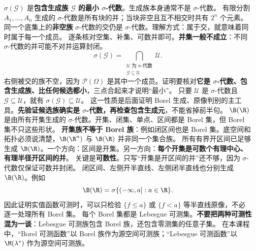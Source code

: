 $\sigma(\mathcal G)$ 是\textbf{包含生成族 $\mathcal G$ 的最小 $\sigma$-代数}。生成族本身通常不是 $\sigma$-代数。
有限分割 $A_1,\ldots,A_n$ 生成的 $\sigma$-代数是所有块的并；当块非空且互不相交时共有 $2^n$ 个元素。
同一个底集上的\textbf{非空族} $\sigma$-代数的交仍是 $\sigma$-代数。理解方式：属于交，就意味着同时属于每一个成员。
逐条核对空集、补集、可数并即可。\textbf{并集一般不成立}：不同 $\sigma$-代数的并可能不对并运算封闭。
\[
\sigma(\mathcal G)=\bigcap_{\substack{\mathcal U\text{ 为 σ-代数}\\\mathcal G\subseteq\mathcal U}}\mathcal U.
\]
右侧被交的族不空，因为 $\mathcal P(\Omega)$ 是其中一个成员。证明要核对\textbf{它是 $\sigma$-代数、包含生成族、比任何候选都小}，三点合起来才说明“最小”。
只要 $\mathcal U$ 是 $\sigma$-代数且 $\mathcal G\subseteq\mathcal U$，就有 $\sigma(\mathcal G)\subseteq\mathcal U$。
这一性质是后面证明 Borel 生成、原像判别的主工具。\textbf{先验证候选族确实是 $\sigma$-代数，再检查包含生成元}，不能省掉前半句。
$\B(\R)$ 是由所有开集生成的 $\sigma$-代数。开集、闭集、单点、区间都是 Borel 集，但 Borel 集不只这些形状。
\textbf{开集族不等于 Borel 族}：例如闭区间也是 Borel 集。底空间和拓扑必须说清楚，$\B(\R^n)$ 与 $\B(\R)$ 并非同一个集合族。
所有有界开区间已足够生成 $\B(\R)$。一个方向：区间是开集。另一方向：\textbf{每个开集是可数个有理中心、有理半径开区间的并}。
关键是\textbf{可数性}。只写“开集是开区间的并”还不够，因为 $\sigma$-代数仅保证可数并封闭。
闭区间、左侧开半直线、左侧闭半直线也分别生成 $\B(\R)$。例如
\[
\B(\R)=\sigma\{(-\infty,a]:a\in\R\}.
\]
因此证明实值函数可测时，可以只检验 $\{f\le a\}$ 或 $\{f<a\}$ 等半直线原像，不必逐一处理所有 Borel 集。
每个 Borel 集都是 Lebesgue 可测集。\textbf{不要把两种可测性混为一谈}：Lebesgue 可测族包含 Borel 族，还包含零测集的任意子集。
在本课程中，“Borel 可测函数”以 Borel 族作为源空间可测族；“Lebesgue 可测函数”以 $\M(\lambda^*)$ 作为源空间可测族。
